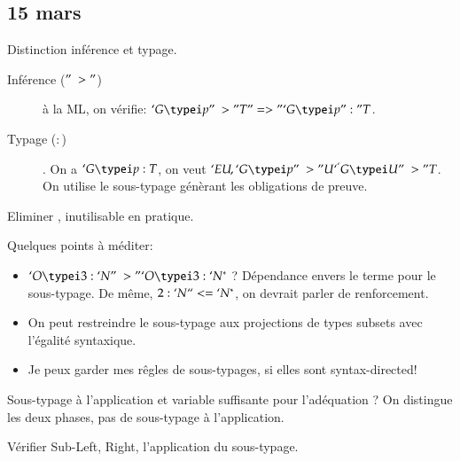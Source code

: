 \subsection*{15 mars}
Distinction inf\'erence et typage. 
\begin{description}
\item[Inf\'erence ($"~>"$)] \`a la ML, on v\'erifie: $`G \type p "~>" T "=>"
  `G \type p ":" T$. 
\item[Typage ($:$)]. On a $`G \type p : T$, on veut $`E U, `G \type p
  "~>" U `^ `G \type U "~>" T$. On utilise le sous-typage g\'en\`erant les
  obligations de preuve.
\end{description}

Eliminer , inutilisable en pratique.

Quelques points \`a m\'editer:
\begin{itemize}
\item $`O \type 3 : `N "~>" `O \type 3 : `N^*$ ? D\'ependance envers le
  terme pour le sous-typage. De m\^eme, $2 : `N ``<= `N^*$, on devrait
  parler de renforcement.
\item On peut restreindre le sous-typage aux projections de types
  subsets avec l'\'egalit\'e syntaxique.
\item Je peux garder mes r\^egles de sous-typages, si elles sont syntax-directed!
\end{itemize}

Sous-typage \`a l'application et variable suffisante pour l'ad\'equation ?
On distingue les deux phases, pas de sous-typage \`a l'application.

V\'erifier Sub-{Left, Right}, l'application du sous-typage.

